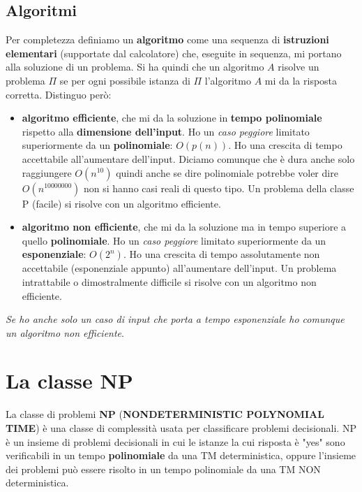 \subsection{Algoritmi}
Per completezza definiamo un \textbf{algoritmo} come una sequenza di
\textbf{istruzioni elementari} (supportate dal calcolatore) che, eseguite in
sequenza, mi portano alla soluzione di un problema. Si ha quindi che un
algoritmo $A$ risolve un problema $\Pi$ se per ogni possibile istanza di $\Pi$
l'algoritmo $A$ mi da la risposta corretta. Distinguo però:
\begin{itemize}
	\item \textbf{algoritmo efficiente}, che mi da la soluzione in \textbf{tempo
	      polinomiale} rispetto alla \textbf{dimensione dell'input}. Ho un
	\textit{caso peggiore} limitato superiormente da un \textbf{polinomiale}:
	$O(p(n))$. Ho una crescita di tempo accettabile all'aumentare
	dell'input. Diciamo comunque che è dura anche solo raggiungere $O(n^{10})$
	quindi anche se dire polinomiale potrebbe voler dire $O(n^{10000000})$ non si
	hanno casi reali di questo tipo. Un problema della classe P (facile) si risolve con un algoritmo efficiente.
		  
	\item \textbf{algoritmo non efficiente}, che mi da la soluzione ma in tempo
	      superiore a quello \textbf{polinomiale}. Ho un \textit{caso peggiore} limitato
	      superiormente da un \textbf{esponenziale}: $O(2^n)$. Ho una crescita di tempo
	      assolutamente non accettabile (esponenziale appunto) all'aumentare dell'input. Un problema intrattabile o dimostralmente difficile si risolve con un algoritmo non efficiente.
\end{itemize}
\textit{Se ho anche solo un caso di input che porta a tempo esponenziale ho
	comunque un algoritmo non efficiente}.\\

\section{La classe NP}
La classe di problemi \textbf{NP} (\textbf{NONDETERMINISTIC POLYNOMIAL TIME}) è una classe di complessità usata per classificare problemi decisionali. NP è un insieme di problemi decisionali in cui le istanze la cui risposta è "yes" sono verificabili in un tempo \textbf{polinomiale} da una TM deterministica, oppure l'insieme dei problemi può essere risolto in un tempo polinomiale da una TM NON deterministica.


